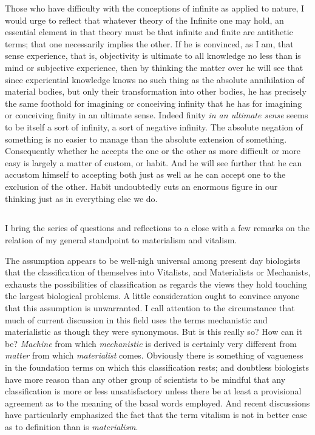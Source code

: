 \documentclass[a4paper, 11pt, oneside, polutonikogreek, english]{article}
\begin{document}
Those who have difficulty with the conceptions of infinite as applied to nature, I would urge to reflect that whatever theory of the Infinite one may hold, an essential element in that theory must be that infinite and finite are antithetic terms; that one necessarily implies the other. If he is convinced, as I am, that sense experience, that is, objectivity is ultimate to all knowledge no less than is mind or subjective experience, then by thinking the matter over he will see that since experiential knowledge knows no such thing as the absolute annihilation of material bodies, but only their transformation into other bodies, he has precisely the same foothold for imagining or conceiving infinity that he has for imagining or conceiving finity in an ultimate sense. Indeed finity \emph{in an ultimate sense} seems to be itself a sort of infinity, a sort of negative infinity. The absolute negation of something is no easier to manage than the absolute extension of something. Consequently whether he accepts the one or the other as more difficult or more easy is largely a matter of custom, or habit. And he will see further that he can accustom himself to accepting both just as well as he can accept one to the exclusion of the other. Habit undoubtedly cuts an enormous figure in our thinking just as in everything else we do.

\subsection{}
\paragraph{}
I bring the series of questions and reflections to a close with a few remarks on the relation of my general standpoint to materialism and vitalism.

The assumption appears to be well-nigh universal among present day biologists that the classification of themselves into Vitalists, and Materialists or Mechanists, exhausts the possibilities of classification as regards the views they hold touching the largest biological problems. A little consideration ought to convince anyone that this assumption is unwarranted. I call attention to the circumstance that much of current discussion in this field uses the terms mechanistic and materialistic as though they were synonymous. But is this really so? How can it be? \emph{Machine} from which \emph{mechanistic} is derived is certainly very different from \emph{matter} from which \emph{materialist} comes. Obviously there is something of vagueness in the foundation terms on which this classification rests; and doubtless biologists have more reason than any other group of scientists to be mindful that any classification is more or less unsatisfactory unless there be at least a provisional agreement as to the meaning of the basal words employed. And recent discussions have particularly emphasized the fact that the term vitalism is not in better case as to definition than is \emph{materialism}.
\end{document}
